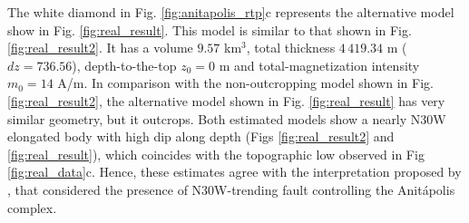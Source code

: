 The white diamond in Fig. \ref{fig:anitapolis_rtp}c represents the alternative 
model show in Fig. \ref{fig:real_result}. This model is similar to that shown in 
Fig. \ref{fig:real_result2}. It has a volume $ 9.57 $ km$ ^3 $, total thickness 
$ 4\,419.34 $ m ($ dz = 736.56 $), depth-to-the-top $z_0 = 0$ m and 
total-magnetization intensity $m_0 = 14$ A/m. 
In comparison with the non-outcropping model shown in Fig. \ref{fig:real_result2}, the 
alternative model shown in Fig. \ref{fig:real_result} has very similar geometry,
but it outcrops.
Both estimated models show a nearly N30W elongated body with high dip 
along depth (Figs \ref{fig:real_result2} and \ref{fig:real_result}), 
which coincides with the topographic low observed in Fig \ref{fig:real_data}c. 
Hence, these estimates agree with the interpretation proposed by 
\citet{horbach-marimon1980}, that considered the presence of N30W-trending fault 
controlling the Anit{\'a}polis complex.